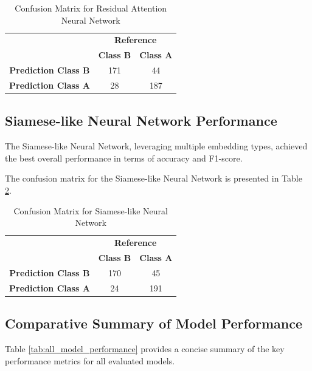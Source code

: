 \documentclass{article}
\begin{document}
\begin{table}[h!]
\centering
\begin{tabular}{|c|c|c|}
\hline
 & \multicolumn{2}{c|}{\textbf{Reference}} \\
\cline{2-3}
 & \textbf{Class B} & \textbf{Class A} \\
\hline
\textbf{Prediction Class B} & 171 & 44 \\
\hline
\textbf{Prediction Class A} & 28 & 187 \\
\hline
\end{tabular}
\caption{Confusion Matrix for Residual Attention Neural Network}
\label{tab:residual_attention_cm}
\end{table}

\subsection{Siamese-like Neural Network Performance}
The Siamese-like Neural Network, leveraging multiple embedding types, achieved the best overall performance in terms of accuracy and F1-score.

The confusion matrix for the Siamese-like Neural Network is presented in Table \ref{tab:siamese_cm}.

\begin{table}[h!]
\centering
\begin{tabular}{|c|c|c|}
\hline
 & \multicolumn{2}{c|}{\textbf{Reference}} \\
\cline{2-3}
 & \textbf{Class B} & \textbf{Class A} \\
\hline
\textbf{Prediction Class B} & 170 & 45 \\
\hline
\textbf{Prediction Class A} & 24 & 191 \\
\hline
\end{tabular}
\caption{Confusion Matrix for Siamese-like Neural Network}
\label{tab:siamese_cm}
\end{table}

\subsection{Comparative Summary of Model Performance}
Table \ref{tab:all_model_performance} provides a concise summary of the key performance metrics for all evaluated models.
\end{document}
